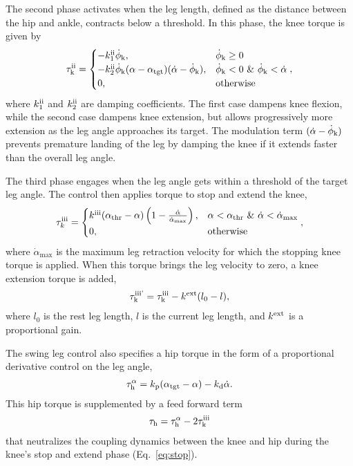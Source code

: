 The second phase activates when the leg length, defined as the distance between
the hip and ankle, contracts below a threshold. In this phase, the knee torque
is given by
\begin{align}
    \tau_{\textnormal{k}}^{\textnormal{ii}} = \begin{cases}
          -k_1^{\textnormal{ii}} \dot \phi_{\textnormal{k}}, & \dot \phi_{\textnormal{k}} \ge 0 \\
          -k_2^{\textnormal{ii}} \dot \phi_{\textnormal{k}}(\alpha - \alpha_{\textnormal{tgt}})
            (\dot{\alpha} - \dot \phi_{\textnormal{k}}), 
          & \dot\phi_{\textnormal{k}} < 0 \ \& \ \dot \phi_{\textnormal{k}} < \dot \alpha\\
          0, & \mathrm{otherwise}
      \end{cases},
    \label{eq:holdphase}
\end{align}
where $k_1^{\textnormal{ii}}$ and $k_2^{\textnormal{ii}}$ are damping coefficients. The first case
dampens knee flexion, while the second case dampens knee extension, but allows
progressively more extension as the leg angle approaches its target. The
modulation term $(\dot \alpha - \dot \phi_{\textnormal{k}})$ prevents premature landing of
the leg by damping the knee if it extends faster than the overall leg angle.

The third phase engages when the leg angle gets within a threshold of the
target leg angle. The control then applies torque to stop and extend the knee,  
\begin{align}
    \tau_k^{\textnormal{iii}} = 
    \begin{cases}
         k^{\textnormal{iii}}(\alpha_{\textnormal{thr}} - \alpha)
            \left(1 - \frac{\dot\alpha}{\dot\alpha_{\textnormal{max}}} \right), 
                & \alpha < \alpha_{\textnormal{thr}} \ \& \ \dot \alpha < \dot \alpha_{\textnormal{max}} \\
        0, & \textnormal{otherwise}
    \end{cases},
    \label{eq:stop}
\end{align}
where $\dot{\alpha}_{\mathrm{max}}$ is the maximum leg retraction velocity for
which the stopping knee torque is applied. When this torque brings the leg
velocity to zero, a knee extension torque is added,
\begin{align}
    \tau_{\textnormal{k}}^{\textnormal{iii'}} = \tau_{\textnormal{k}}^{\textnormal{iii}} - k^{\textnormal{ext}} (l_0 - l),
    \label{eq:extend}
\end{align}
where $l_0$ is the rest leg length, $l$ is the current leg length, and
$k^{\textnormal{ext}}$ is a proportional gain. 

The swing leg control also specifies a hip torque in the form of a proportional
derivative control on the leg angle, 
\begin{align}
    \tau_{\textnormal{h}}^\alpha = k_{\textnormal{p}} (\alpha_{\textnormal{tgt}} - \alpha) - k_{\textnormal{d}} \dot\alpha.
    \label{eq:hipfeedback}
\end{align}
This hip torque is supplemented by a feed forward term 
\begin{align}
    \tau_{\textnormal{h}} = \tau_{\textnormal{h}}^\alpha - 2 \tau_{\textnormal{k}}^{\textnormal{iii}}
    \label{eq:hipfeedforward}
\end{align} 
that neutralizes the coupling dynamics between the knee and hip during the
knee's stop and extend phase (Eq.~\ref{eq:stop}).

